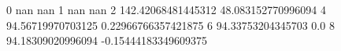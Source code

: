 0 nan nan
1 nan nan
2 142.42068481445312 48.083152770996094
4 94.56719970703125 0.22966766357421875
6 94.33753204345703 0.0
8 94.18309020996094 -0.15444183349609375

